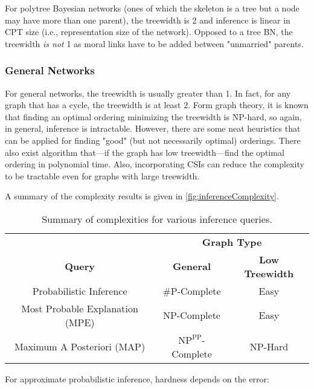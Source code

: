 				For polytree Bayesian networks (ones of which the skeleton is a tree but a node may have more than one parent), the treewidth is \num{2} and inference is linear in CPT size (i.e., representation size of the network). Opposed to a tree BN, the treewidth \emph{is not} \num{1} as moral links have to be added between "unmarried" parents.

			\subsubsection{General Networks}
				For general networks, the treewidth is usually greater than \num{1}. In fact, for any graph that has a cycle, the treewidth is at least \num{2}. Form graph theory, it is known that finding an optimal ordering minimizing the treewidth is NP-hard, so again, in general, inference is intractable. However, there are some neat heuristics that can be applied for finding "good" (but not necessarily optimal) orderings. There also exist algorithm that---if the graph has low treewidth---find the optimal ordering in polynomial time. Also, incorporating CSIs can reduce the complexity to be tractable even for graphs with large treewidth.

				A summary of the complexity results is given in \autoref{fig:inferenceComplexity}.

				\begin{table}
					\centering
					\begin{tabular}{c|c|c}
						\toprule
						                                &          \multicolumn{2}{c}{\textbf{Graph Type}}          \\
						        \textbf{Query}          &         \textbf{General}         & \textbf{Low Treewidth} \\ \midrule
						    Probabilistic Inference     &           \#P-Complete           &          Easy          \\
						Most Probable Explanation (MPE) &           NP-Complete            &          Easy          \\
						  Maximum A Posteriori (MAP)    & \(\text{NP}^\text{PP}\)-Complete &        NP-Hard         \\ \bottomrule
					\end{tabular}
					\begin{center}
						For approximate probabilistic inference, hardness depends on the error: \\
						 \\
					\end{center}
					\vspace{-0.4cm}
					\caption[Summary of Inference Complexities]{Summary of complexities for various inference queries.}
					\label{fig:inferenceComplexity}
				\end{table}

